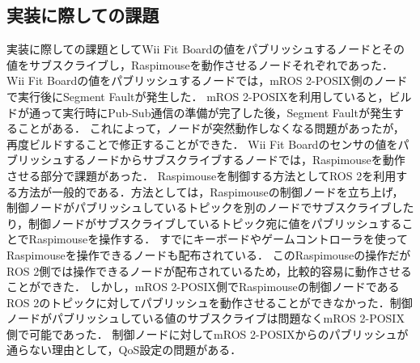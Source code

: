 \subsection{実装に際しての課題}
実装に際しての課題としてWii Fit Boardの値をパブリッシュするノードとその値をサブスクライブし，Raspimouseを動作させるノードそれぞれであった．
Wii Fit Boardの値をパブリッシュするノードでは，mROS 2-POSIX側のノードで実行後にSegment Faultが発生した．
mROS 2-POSIXを利用していると，ビルドが通って実行時にPub-Sub通信の準備が完了した後，Segment Faultが発生することがある．
これによって，ノードが突然動作しなくなる問題があったが，再度ビルドすることで修正することができた．
Wii Fit Boardのセンサの値をパブリッシュするノードからサブスクライブするノードでは，Raspimouseを動作させる部分で課題があった．
Raspimouseを制御する方法としてROS 2を利用する方法が一般的である．方法としては，Raspimouseの制御ノードを立ち上げ，制御ノードがパブリッシュしているトピックを別のノードでサブスクライブしたり，制御ノードがサブスクライブしているトピック宛に値をパブリッシュすることでRaspimouseを操作する．
すでにキーボードやゲームコントローラを使ってRaspimouseを操作できるノードも配布されている．
このRaspimouseの操作だがROS 2側では操作できるノードが配布されているため，比較的容易に動作させることができた．
しかし，mROS 2-POSIX側でRaspimouseの制御ノードであるROS 2のトピックに対してパブリッシュを動作させることができなかった．制御ノードがパブリッシュしている値のサブスクライブは問題なくmROS 2-POSIX側で可能であった．
制御ノードに対してmROS 2-POSIXからのパブリッシュが通らない理由として，QoS設定の問題がある．
